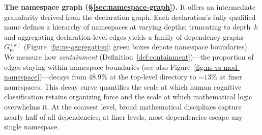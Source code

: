 \medskip
\noindent\textbf{The namespace graph (\S\ref{sec:namespace-graph}).}
It offers an intermediate granularity derived from the declaration graph. Each declaration's fully qualified name defines a hierarchy of namespaces at varying depths; truncating to depth~$k$ and aggregating declaration-level edges yields a family of dependency graphs $G_{\mathrm{ns}}^{(k)}$ (Figure~\ref{fig:ns-aggregation}; \textcolor{green!40!black}{green boxes} denote namespace boundaries). We measure how \emph{containment} (Definition~\ref{def:containment})---the proportion of edges staying within namespace boundaries (see also Figure~\ref{fig:ns-vs-mod-namespace})---decays from $48.9\%$ at the top-level directory to ${\sim}13\%$ at finer namespaces. This decay curve quantifies the scale at which human cognitive classification retains organizing force and the scale at which mathematical logic overwhelms it. At the coarsest level, broad mathematical disciplines capture nearly half of all dependencies; at finer levels, most dependencies escape any single namespace.


